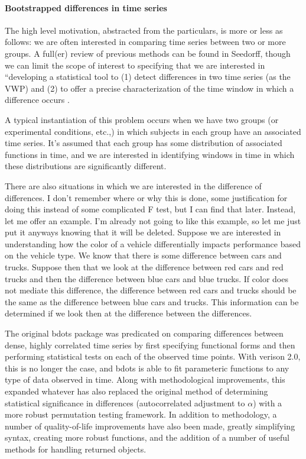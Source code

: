 \documentclass{article}
\begin{document}
\paragraph{Bootstrapped differences in time series}

The high level motivation, abstracted from the particulars, is more or less as follows: we are often interested in comparing time series between two or more groups. A full(er) review of previous methods can be found in Seedorff,  though we can limit the scope of interest to specifying that we are interested in ``developing a statistical tool to (1) detect differences in two time series (as the VWP) and (2) to offer a precise characterization of the time window in which a difference occurs \cite{seedorff2018bdots}. 

A typical instantiation of this problem occurs when we have two groups (or experimental conditions, etc.,) in which subjects in each group have an associated time series. It's assumed that each group has some distribution of associated functions in time, and we are interested in identifying windows in time in which these distributions are significantly different.

There are also situations in which we are interested in the difference of differences. I don't remember where or why this is done, some justification for doing this instead of some complicated F test, but I can find that later. Instead, let me offer an example. I'm already not going to like this example, so let me just put it anyways knowing that it will be deleted. Suppose we are interested in understanding how the color of a vehicle differentially impacts performance based on the vehicle type. We know that there is some difference between cars and trucks. Suppose then that we look at the difference between red cars and red trucks and then the difference between blue cars and blue trucks. If color does not mediate this difference, the difference between red cars and trucks should be the same as the difference between blue cars and trucks. This information can be determined if we look then at the difference between the differences. 

The original bdots package was predicated on comparing differences between dense, highly correlated time series by first specifying functional forms and then performing statistical tests on each of the observed time points. With verison 2.0, this is no longer the case, and bdots is able to fit parameteric functions to any type of data observed in time. Along with methodological improvements, this expanded whatever has also replaced the original method of determining statistical significance in differences (autocorrelated adjustment to $\alpha$) with a more robust permutation testing framework. In addition to methodology, a number of quality-of-life improvements have also been made, greatly simplifying syntax, creating more robust functions, and the addition of a number of useful methods for handling returned objects.
\end{document}
